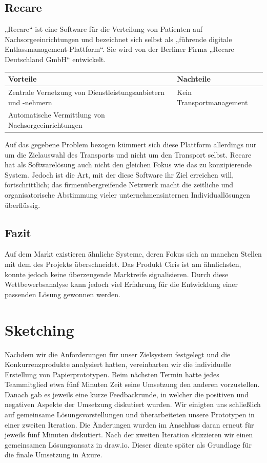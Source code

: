 \documentclass[a4paper, ngerman, 12pt]{scrartcl}
\begin{document}
\subsection{Recare}
„Recare“ ist eine Software für die Verteilung von Patienten auf Nachsorgeeinrichtungen und bezeichnet sich selbst als „führende digitale Entlassmanagement-Plattform“. Sie wird von der Berliner Firma „Recare Deutschland GmbH“ entwickelt.\\
\begin{center}
\begin{tabular}{|p{}|p{}|}
\hline
\cellcolor{lightgray}\textbf{Vorteile}	&\cellcolor{lightgray}\textbf{Nachteile}\\
\hline
Zentrale Vernetzung von Dienstleistungsanbietern und -nehmern	&Kein Transportmanagement\\
\hline
Automatische Vermittlung von Nachsorgeeinrichtungen	&\\
\hline
\end{tabular}
\end{center}
Auf das gegebene Problem bezogen kümmert sich diese Plattform allerdings nur um die Zielauswahl des Transports und nicht um den Transport selbst. Recare hat als Softwarelösung auch nicht den gleichen Fokus wie das zu konzipierende System. Jedoch ist die Art, mit der diese Software ihr Ziel erreichen will, fortschrittlich; das firmenübergreifende Netzwerk macht die zeitliche und organisatorische Abstimmung vieler unternehmensinternen Individuallösungen überflüssig.
\subsection{Fazit}
Auf dem Markt existieren ähnliche Systeme, deren Fokus sich an manchen Stellen mit dem des Projekts überschneidet. Das Produkt Ciris ist am ähnlichsten, konnte jedoch keine überzeugende Marktreife signalisieren. Durch diese Wettbewerbsanalyse kann jedoch viel Erfahrung für die Entwicklung einer passenden Lösung gewonnen werden.
\section{Sketching}
Nachdem wir die Anforderungen für unser Zielsystem festgelegt und die Konkurrenzprodukte analysiert hatten, vereinbarten wir die individuelle Erstellung von Papierprototypen. Beim nächsten Termin hatte jedes Teammitglied etwa fünf Minuten Zeit seine Umsetzung den anderen vorzustellen. Danach gab es jeweils eine kurze Feedbackrunde, in welcher die positiven und negativen Aspekte der Umsetzung diskutiert wurden. Wir einigten uns schließlich auf gemeinsame Lösungsvorstellungen und überarbeiteten unsere Prototypen in einer zweiten Iteration. Die Änderungen wurden im Anschluss daran erneut für jeweils fünf Minuten diskutiert. Nach der zweiten Iteration skizzieren wir einen gemeinsamen Lösungsansatz in draw.io. Dieser diente später als Grundlage für die finale Umsetzung in Axure.
\end{document}
